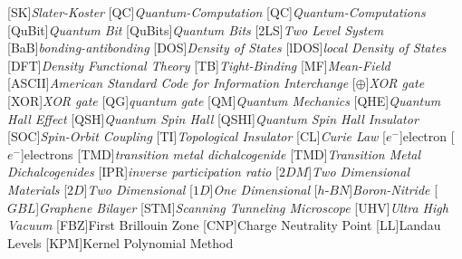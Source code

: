 \begin{acronym}[TDMA]
  [SK]{\emph{Slater-Koster}}
  [QC]{\emph{Quantum-Computation}}
  [QC]{\emph{Quantum-Computations}}
  [QuBit]{\emph{Quantum Bit}}
  [QuBits]{\emph{Quantum Bits}}
  [2LS]{\emph{Two Level System}}
  [BaB]{\emph{bonding-antibonding}}
  [DOS]{\emph{Density of States}}
  [lDOS]{\emph{local Density of States}}
  [DFT]{\emph{Density Functional Theory}}
  [TB]{\emph{Tight-Binding}}
  [MF]{\emph{Mean-Field}}
  [ASCII]{\emph{American Standard Code for Information Interchange}}
  [$\oplus$]{\emph{XOR gate}}
  [XOR]{\emph{XOR gate}}
  [QG]{\emph{quantum gate}}
  [QM]{\emph{Quantum Mechanics}}
  [QHE]{\emph{Quantum Hall Effect}}
  [QSH]{\emph{Quantum Spin Hall}}
  [QSHI]{\emph{Quantum Spin Hall Insulator}}
  [SOC]{\emph{Spin-Orbit Coupling}}
  [TI]{\emph{Topological Insulator}}
  [CL]{\emph{Curie Law}}
  [$e^{-}$]{electron}
  [$e^{-}$]{electrons}
  [TMD]{\emph{transition metal dichalcogenide}}
  [TMD]{\emph{Transition Metal Dichalcogenides}}
  [IPR]{\emph{inverse participation ratio}}
  [$2DM$]{\emph{Two Dimensional Materials}}
  [$2D$]{\emph{Two Dimensional}}
  [$1D$]{\emph{One Dimensional}}
  [$h$-$BN$]{\emph{Boron-Nitride}}
  [$GBL$]{\emph{Graphene Bilayer}}
  [STM]{\emph{Scanning Tunneling Microscope}}
  [UHV]{\emph{Ultra High Vacuum}}
  [FBZ]{First Brillouin Zone}
  [CNP]{Charge Neutrality Point}
  [LL]{Landau Levels}
  [KPM]{Kernel Polynomial Method}
\end{acronym}
